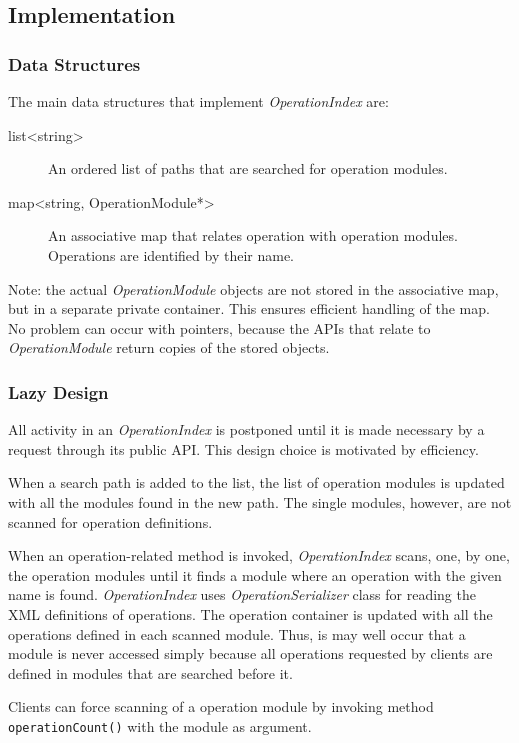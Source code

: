\documentclass[a4paper,twoside]{tce}
\begin{document}
\subsection{Implementation}

\subsubsection{Data Structures}
The main data structures that implement \emph{OperationIndex} are:
\begin{description}
\item[list<string>]%
  An ordered list of paths that are searched for operation modules.
\item[map<string, OperationModule*>]%
  An associative map that relates operation with operation modules.
  Operations are identified by their name.
\end{description}

Note: the actual \emph{OperationModule} objects are not stored in the
associative map, but in a separate private container.  This ensures
efficient handling of the map.  No problem can occur with pointers, because
the APIs that relate to \emph{OperationModule} return copies of the stored
objects.

\subsubsection{Lazy Design}
All activity in an \emph{OperationIndex} is postponed until it is made
necessary by a request through its public API.  This design choice is
motivated by efficiency.

When a search path is added to the list, the list of operation modules is
updated with all the modules found in the new path.  The single modules,
however, are not scanned for operation definitions.

When an operation-related method is invoked, \emph{OperationIndex} scans,
one, by one, the operation modules until it finds a module where an
operation with the given name is found. \emph{OperationIndex} uses
\emph{OperationSerializer} class for reading the XML definitions
of operations.  The operation container is
updated with all the operations defined in each scanned module.  Thus, is
may well occur that a module is never accessed simply because all operations
requested by clients are defined in modules that are searched before it.

Clients can force scanning of a operation module by invoking method
\verb|operationCount()| with the module as argument.
\end{document}
